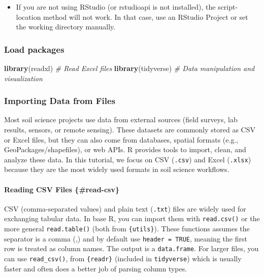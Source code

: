 \documentclass[
  10pt,
  b5paper,
  oneside]{book}
\newenvironment{Shaded}{\begin{snugshade}}{\end{snugshade}}
\newcommand{\CommentTok}[1]{\textcolor[rgb]{0.56,0.35,0.01}{\textit{#1}}}
\newcommand{\FunctionTok}[1]{\textcolor[rgb]{0.13,0.29,0.53}{\textbf{#1}}}
\newcommand{\NormalTok}[1]{#1}
\providecommand{\tightlist}{%
  \setlength{\itemsep}{0pt}\setlength{\parskip}{0pt}}
\begin{document}
\begin{itemize}
\tightlist
\item
  If you are not using RStudio (or rstudioapi is not installed), the script-location method will not work. In that case, use an RStudio Project or set the working directory manually.
\end{itemize}

\subsubsection{Load packages}\label{load-packages}

\begin{Shaded}
\begin{Highlighting}[]
\FunctionTok{library}\NormalTok{(readxl)           }\CommentTok{\# Read Excel files}
\FunctionTok{library}\NormalTok{(tidyverse)        }\CommentTok{\# Data manipulation and visualization}
\end{Highlighting}
\end{Shaded}

\subsubsection{Importing Data from Files}\label{import-files}

Most soil science projects use data from external sources (field surveys, lab results, sensors, or remote sensing). These datasets are commonly stored as CSV or Excel files, but they can also come from databases, spatial formats (e.g., GeoPackages/shapefiles), or web APIs. R provides tools to import, clean, and analyze these data. In this tutorial, we focus on CSV (\texttt{.csv}) and Excel (\texttt{.xlsx}) because they are the most widely used formats in soil science workflows.

\paragraph*{Reading CSV Files \{\#read-csv\}}\label{reading-csv-files-read-csv}

CSV (comma-separated values) and plain text (\texttt{.txt}) files are widely used for exchanging tabular data. In base R, you can import them with \texttt{read.csv()} or the more general \texttt{read.table()} (both from \texttt{\{utils\}}).
These functions assumes the separator is a comma (,) and by default use \texttt{header\ =\ TRUE}, meaning the first row is treated as column names.
The output is a \texttt{data.frame}.
For larger files, you can use \texttt{read\_csv()}, from \texttt{\{readr\}} (included in \texttt{tidyverse}) which is usually faster and often does a better job of parsing column types.
\end{document}
